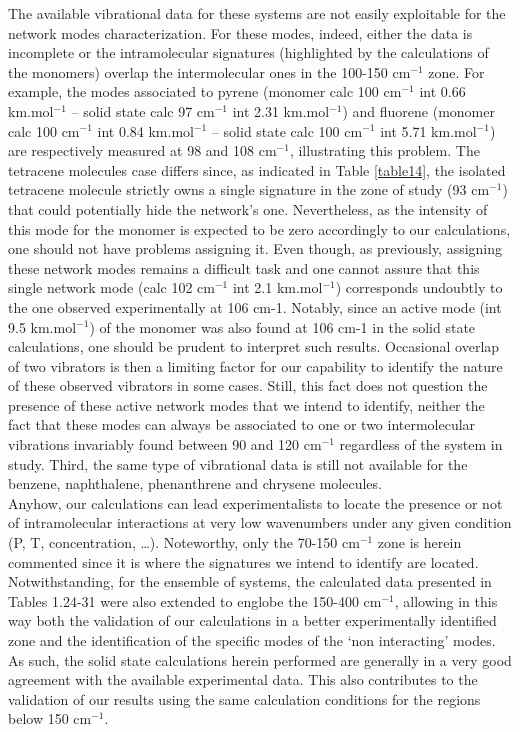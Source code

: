  	The available vibrational data for these  systems are not easily exploitable for the network modes characterization. For these modes, indeed, either the data is incomplete or the intramolecular signatures (highlighted by the calculations of the monomers) overlap the intermolecular ones in the 100-150 cm$^{-1}$ zone.  For example, the modes associated to pyrene (monomer calc 100 cm$^{-1}$ int 0.66 km.mol$^{-1}$ – solid state calc 97 cm$^{-1}$ int 2.31 km.mol$^{-1}$) and fluorene (monomer calc 100 cm$^{-1}$ int 0.84 km.mol$^{-1}$ – solid state calc 100 cm$^{-1}$ int 5.71 km.mol$^{-1}$) are respectively measured at 98 and 108 cm$^{-1}$, illustrating this problem.
 	The tetracene molecules case differs since, as indicated in Table \ref{table14}, the isolated tetracene molecule strictly owns a single signature in the zone of study (93 cm$^{-1}$) that could potentially hide the network’s one. Nevertheless, as the intensity of this mode for the monomer is expected to be zero accordingly to our calculations, one should not have problems assigning it. Even though, as previously, assigning these network modes remains a difficult task and one cannot assure that this single network mode (calc 102 cm$^{-1}$ int 2.1 km.mol$^{-1}$) corresponds undoubtly to the one observed experimentally at 106 cm-1. Notably, since an active mode (int 9.5 km.mol$^{-1}$) of the monomer was also found at 106 cm-1 in the solid state calculations, one should be prudent to interpret such results. Occasional overlap of two vibrators is then a limiting factor for our capability to identify the nature of these observed vibrators in some cases. Still, this fact does not question the presence of these active network modes that we intend to identify, neither the fact that these modes can always be associated to one or two intermolecular vibrations invariably found between 90 and 120 cm$^{-1}$ regardless of the system in study. Third, the same type of vibrational data is still not available for the benzene, naphthalene, phenanthrene and chrysene molecules.\\ 
 	
 	Anyhow, our calculations can lead experimentalists to locate the presence or not of intramolecular interactions at very low wavenumbers under any given condition (P, T, concentration, …). Noteworthy, only the 70-150 cm$^{-1}$ zone is herein commented since it is where the signatures we intend to identify are located. Notwithstanding, for the ensemble of systems, the calculated data presented in Tables 1.24-31 were also extended to englobe the 150-400 cm$^{-1}$, allowing in this way both the validation of our calculations in a better experimentally identified zone and the identification of the specific modes of the ‘non interacting’ modes. As such, the solid state calculations herein performed are generally in a very good agreement with the available experimental data. This also contributes to the validation of our results using the same calculation conditions for the regions below 150 cm$^{-1}$.\\
 	
